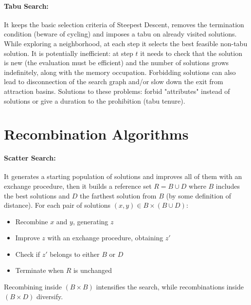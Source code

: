\documentclass{article}
\begin{document}
	\paragraph{Tabu Search:} It keeps the basic selection criteria of Steepest Descent, removes the termination condition (beware of cycling) and imposes a tabu on already visited solutions. While exploring a neighborhood, at each step it selects the best feasible non-tabu solution. It is potentially inefficient: at step $t$ it needs to check that the solution is new (the evaluation must be efficient) and the number of solutions grows indefinitely, along with the memory occupation. Forbidding solutions can also lead to disconnection of the search graph and/or slow down the exit from attraction basins. Solutions to these problems: forbid "attributes" instead of solutions or give a duration to the prohibition (tabu tenure).\\
	
	\section*{Recombination Algorithms}
	
	\paragraph{Scatter Search:} It generates a starting population of solutions and improves all of them with an exchange procedure, then it builds a reference set $R = B \cup D$ where $B$ includes the best solutions and $D$ the farthest solution from $B$ (by some definition of distance). For each pair of solutions $(x,y) \in B \times (B \cup D)$: 
	\begin{itemize}
		\item Recombine $x$ and $y$, generating $z$
		\item Improve $z$ with an exchange procedure, obtaining $z'$
		\item Check if $z'$ belongs to either $B$ or $D$
		\item Terminate when $R$ is unchanged
	\end{itemize}
	Recombining inside $(B \times B)$ intensifies the search, while recombinations inside $(B \times D)$ diversify.\\
	
\end{document}
